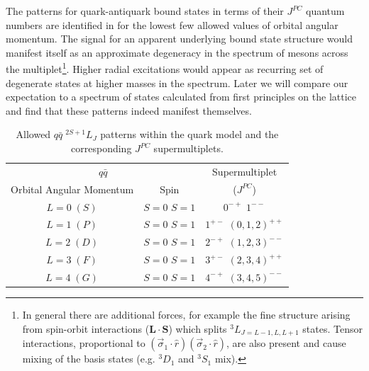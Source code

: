 The patterns for quark-antiquark bound states in terms of their $J^{PC}$ quantum numbers are identified in  for the lowest few allowed values of orbital angular momentum. The signal for an apparent underlying bound state structure would manifest itself as an approximate degeneracy in the spectrum of mesons across the multiplet\footnote{In general there are additional forces, for example the fine structure arising from spin-orbit interactions ($\mathbf{L} \cdot \mathbf{S}$) which splits $^3L_{J=L-1,L,L+1}$ states. Tensor interactions, proportional to $\left(\vec{\sigma}_1\cdot \hat{r} \right)\left(\vec{\sigma}_2\cdot \hat{r}\right)$, are also present and cause mixing of the basis states (e.g. $^3D_1$ and $^3S_1$ mix). }. Higher radial excitations would appear as recurring set of degenerate states at higher masses in the spectrum. Later we will compare our expectation to a spectrum of states calculated from first principles on the lattice and find that these patterns indeed manifest themselves. 

\begin{table}[htbp]
\caption{Allowed $q\bar{q} \; ^{2S+1}L_J$ patterns within the quark model and the corresponding $J^{PC}$ supermultiplets. \label{tab::QM_allowed_table}}
\begin{center}
\begin{tabular}{|cc|c|}
\hline
\multicolumn{2}{|c}{$q\bar{q}$} & \multicolumn{1}{c|}{Supermultiplet} \\
\cline{1-2}
Orbital Angular Momentum    & Spin &  ($J^{PC}$) \\
\hline\hline
$L=0 \;(S)$     & \specialcell{$S=0$ \\ $S=1$}   & \specialcell{$0^{-+}$\\$1^{--}$}     \\ \hline
$L=1 \;(P)$     & \specialcell{$S=0$ \\ $S=1$}   & \specialcell{$1^{+-}$\\$(0,1,2)^{++}$}     \\ \hline
$L=2 \;(D)$     & \specialcell{$S=0$ \\ $S=1$}   & \specialcell{$2^{-+}$\\$(1,2,3)^{--}$}     \\ \hline
$L=3 \;(F)$     & \specialcell{$S=0$ \\ $S=1$}   & \specialcell{$3^{+-}$\\$(2,3,4)^{++}$}     \\ \hline
$L=4 \;(G)$    & \specialcell{$S=0$ \\ $S=1$}    & \specialcell{$4^{-+}$\\$(3,4,5)^{--}$}      \\ \hline
\end{tabular}
\end{center}
\end{table}

